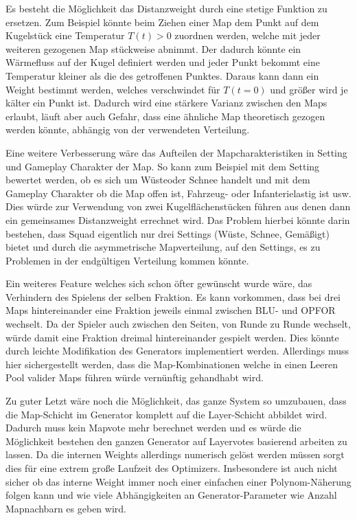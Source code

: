         Es besteht die Möglichkeit das Distanzweight durch eine stetige Funktion zu ersetzen. 
        Zum Beispiel könnte beim Ziehen einer Map dem Punkt auf dem Kugelstück eine Temperatur $T(t)>0$ zuordnen werden,
        welche mit jeder weiteren gezogenen Map stückweise abnimmt.
        Der dadurch könnte ein Wärmefluss auf der Kugel definiert werden und jeder Punkt bekommt eine Temperatur kleiner als die des getroffenen Punktes. 
        Daraus kann dann ein Weight bestimmt werden, 
        welches verschwindet für $T(t=0)$ und größer wird je \glqq{}kälter\grqq{} ein Punkt ist. 
        Dadurch wird eine stärkere Varianz zwischen den Maps erlaubt, 
        läuft aber auch Gefahr, dass eine ähnliche Map theoretisch gezogen werden könnte, abhängig von der verwendeten Verteilung.
        
        Eine weitere Verbesserung wäre das Aufteilen der Mapcharakteristiken in \glqq{}Setting\grqq{} und \glqq{}Gameplay\grqq{} Charakter der Map. 
        So kann zum Beispiel mit dem Setting bewertet werden, ob es sich um \glqq{}Wüste\grqq{}oder \glqq{}Schnee\grqq{} handelt 
        und mit dem Gameplay Charakter ob die Map offen ist, Fahrzeug- oder Infanterielastig ist usw. 
        Dies würde zur Verwendung von zwei Kugelflächenstücken führen aus denen dann ein gemeinsames Distanzweight errechnet wird. 
        Das Problem hierbei könnte darin bestehen, dass Squad eigentlich nur drei Settings (\glqq{}Wüste\grqq{}, \glqq{}Schnee\grqq{}, \glqq{}Gemäßigt\grqq{}) 
        bietet und durch die asymmetrische Mapverteilung, auf den Settings, es zu Problemen in der endgültigen Verteilung kommen könnte.

        Ein weiteres Feature welches sich schon öfter gewünscht wurde wäre, das Verhindern des \glqq{}Spielens der selben Fraktion\grqq{}.
        Es kann vorkommen, dass bei drei Maps hintereinander eine Fraktion jeweils einmal zwischen BLU- und OPFOR wechselt. 
        Da der Spieler auch zwischen den Seiten, von Runde zu Runde wechselt, würde damit eine Fraktion dreimal hintereinander gespielt werden.
        Dies könnte durch leichte Modifikation des Generators implementiert werden. 
        Allerdings muss hier sichergestellt werden, dass die Map-Kombinationen welche in einen \glqq{}Leeren Pool valider Maps\grqq{} führen würde vernünftig gehandhabt wird.

        Zu guter Letzt wäre noch die Möglichkeit, das ganze System so umzubauen, dass die Map-Schicht im Generator komplett auf die Layer-Schicht abbildet wird.
        Dadurch muss kein Mapvote mehr berechnet werden und es würde die Möglichkeit bestehen den ganzen Generator auf Layervotes basierend arbeiten zu lassen.
        Da die internen Weights allerdings numerisch gelöst werden müssen sorgt dies für eine extrem große Laufzeit des Optimizers.
        Insbesondere ist auch nicht sicher ob das interne Weight immer noch einer 
        einfachen einer Polynom-Näherung folgen kann und wie viele Abhängigkeiten an Generator-Parameter wie \glqq{}Anzahl Mapnachbarn\grqq{} es geben wird. 